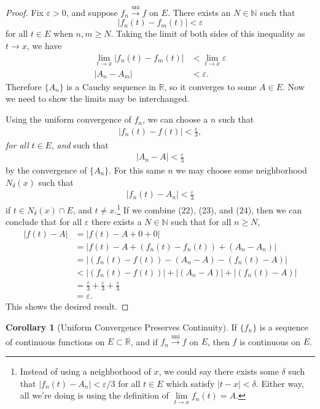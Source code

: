 \documentclass{article}
\newcommand{\N}{\mathbb{N}}
\newcommand{\R}{\mathbb{R}}
\newcommand{\uni}{\overset{\text{uni}}{\to}}
\theoremstyle{definition}
\newtheorem{corollary}{Corollary}[section]
\begin{document}
	\begin{proof}
		Fix $ \varepsilon>0 $, and suppose $ f_n\uni f $ on $ E $. There exists an $ N\in\N $ such that $$ |f_n(t)-f_m(t)|<\varepsilon$$ for all $ t\in E $ when $ n,m\ge N $. Taking the limit of both sides of this inequality as $ t\to x $, we have \begin{align*}
			\lim\limits_{t\to x}|f_n(t)-f_m(t)|&<\lim\limits_{t\to x}\varepsilon\\|A_n-A_m|&<\varepsilon.
		\end{align*}
		Therefore $ \{A_n\} $ is a Cauchy sequence in $ \R $, so it converges to some $ A\in E $. Now we need to show the limits may be interchanged.
		
		Using the uniform convergence of $ f_n $, we can choose a $ n $ such that \begin{align}
			|f_n(t)-f(t)|<\frac{\varepsilon}{3},
		\end{align}
		\textit{for all} $ t\in E $, \textit{and} such that \begin{align}
			|A_n-A|<\frac{\varepsilon}{3}
		\end{align}by the convergence of $ \{A_n\} $. For this same $ n $ we may choose some neighborhood $ N_\delta(x) $ such that\begin{align}
			|f_n(t)-A_n|<\frac{\varepsilon}{3}
		\end{align}  if $ t\in N_\delta(x)\cap E $, and $ t\neq x $.\footnote{Instead of using a neighborhood of $ x $, we could say there exists some $ \delta $ such that $ |f_n(t)-A_n|<\varepsilon/3 $ for all $ t\in E $ which satisfy $ |t-x|<\delta $. Either way, all we're doing is using the definition of $ \lim\limits_{t\to x}f_n(t)=A $. } If we combine (22), (23), and (24), then we can conclude that for all $ \varepsilon $ there exists a $ N\in\N $ such that for all $ n\ge N $, \begin{align*}
			|f(t)-A|&=|f(t)-A+0+0|\\&=|f(t)-A+(f_n(t)-f_n(t))+(A_n-A_n)|\\&=|(f_n(t)-f(t))-(A_n-A)-(f_n(t)-A)|\\&<|(f_n(t)-f(t))|+|(A_n-A)|+|(f_n(t)-A)| \\&=\frac{\varepsilon}{3}+\frac{\varepsilon}{3}+\frac{\varepsilon}{3}\\&=\varepsilon.
		\end{align*}
		This shows the desired result.
	\end{proof}
	\begin{corollary}[Uniform Convergence Preserves Continuity]
		If $ \{f_n\} $ is a sequence of continuous functions on $ E\subset \R $, and if $ f_n\uni f $ on $ E $, then $ f $ is continuous on $ E $.
	\end{corollary}
\end{document}
